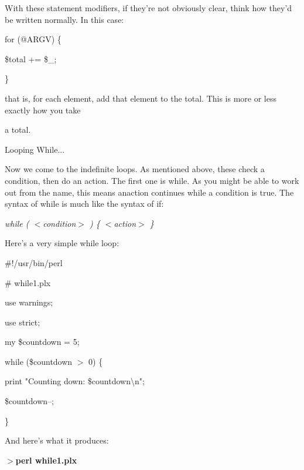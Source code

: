 \documentclass[a4paper,11pt]{book}
\begin{document}
\noindent 

\noindent With these statement modifiers, if they're not obviously clear, think how they'd be written normally. In this case:

\noindent 

\noindent for (@ARGV) \{

\noindent \$total += \$\_;

\noindent \}

\noindent 

\noindent that is,  for  each element,  add  that  element  to  the  total.  This  is  more  or  less  exactly  how  you  take

\noindent a total.

\noindent 

\noindent 

\noindent Looping While...

\noindent 

\noindent Now we come to the indefinite loops. As mentioned above, these check a condition, then do an action. The first one is while. As you might be able to work out from the name, this means anaction continues while a condition is true. The syntax of while is much like the syntax of if:

\noindent 

\noindent \textit{while ( $<$condition$>$ ) \{ $<$action$>$ \}}

\noindent 

\noindent Here's a very simple while loop:

\noindent 

\noindent \#!/usr/bin/perl

\noindent \# while1.plx

\noindent use warnings;

\noindent use strict;

\noindent 

\noindent my \$countdown = 5;

\noindent 

\noindent while (\$countdown $>$ 0) \{

\noindent print "Counting down: \$countdown\textbackslash n";

\noindent \$countdown--;

\noindent \}

\noindent 

\noindent And here's what it produces:

\noindent 

\noindent $>$\textbf{perl while1.plx}
\end{document}

